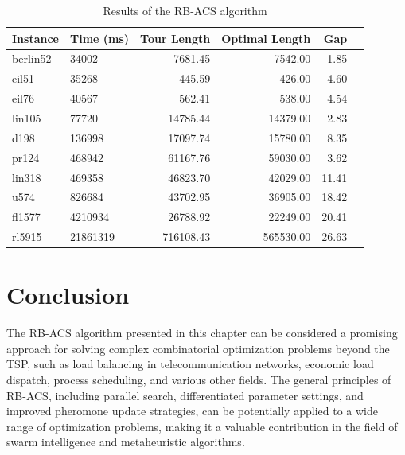 \begin{table}
	\centering
	\caption{Results of the RB-ACS algorithm}
	\begin{tabular}{llrrrr}
		\toprule
		Instance & Time (ms) & Tour Length & Optimal Length & Gap   \\
		\midrule
		berlin52 & 34002      & 7681.45        & 7542.00          & 1.85  \\
		eil51    & 35268      & 445.59         & 426.00           & 4.60  \\
		eil76    & 40567      & 562.41         & 538.00           & 4.54  \\
		lin105   & 77720      & 14785.44       & 14379.00         & 2.83  \\
		d198     & 136998     & 17097.74       & 15780.00         & 8.35  \\
		pr124    & 468942     & 61167.76       & 59030.00         & 3.62  \\
		lin318   & 469358     & 46823.70       & 42029.00         & 11.41 \\
		u574     & 826684     & 43702.95       & 36905.00         & 18.42 \\
		fl1577   & 4210934    & 26788.92       & 22249.00         & 20.41 \\
		rl5915   & 21861319   & 716108.43      & 565530.00        & 26.63 \\
		\bottomrule
	\end{tabular}
\end{table}

\section{Conclusion}

The \Gls{RB-ACS} algorithm presented in this chapter can be considered a promising approach for solving complex combinatorial optimization problems beyond the \Gls{TSP}, such as load balancing in telecommunication networks, economic load dispatch, process scheduling, and various other fields. The general principles of \Gls{RB-ACS}, including parallel search, differentiated parameter settings, and improved pheromone update strategies, can be potentially applied to a wide range of optimization problems, making it a valuable contribution in the field of swarm intelligence and metaheuristic algorithms.
